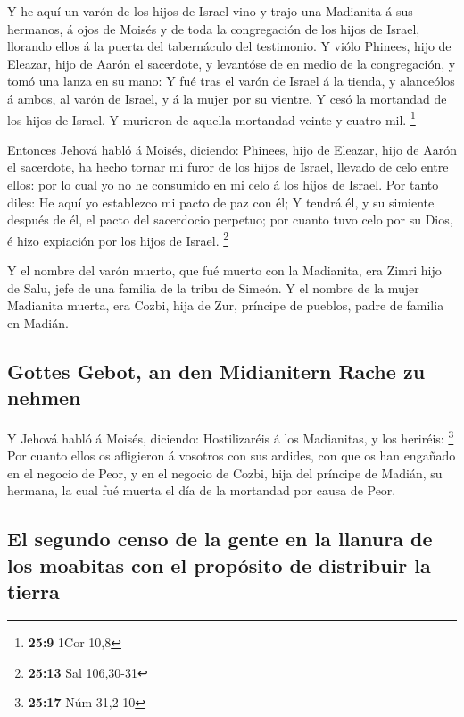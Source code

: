  Y he aquí un varón de los hijos de Israel vino y trajo
una Madianita á sus hermanos, á ojos de Moisés y de toda la congregación
de los hijos de Israel, llorando ellos á la puerta del tabernáculo del
testimonio.  Y viólo Phinees, hijo de Eleazar, hijo de
Aarón el sacerdote, y levantóse de en medio de la congregación, y tomó
una lanza en su mano:  Y fué tras el varón de Israel á la
tienda, y alanceólos á ambos, al varón de Israel, y á la mujer por su
vientre. Y cesó la mortandad de los hijos de Israel.  Y
murieron de aquella mortandad veinte y cuatro mil. \footnote{\textbf{25:9}
  1Cor 10,8}

 Entonces Jehová habló á Moisés, diciendo:
 Phinees, hijo de Eleazar, hijo de Aarón el sacerdote, ha
hecho tornar mi furor de los hijos de Israel, llevado de celo entre
ellos: por lo cual yo no he consumido en mi celo á los hijos de Israel.
 Por tanto diles: He aquí yo establezco mi pacto de paz
con él;  Y tendrá él, y su simiente después de él, el
pacto del sacerdocio perpetuo; por cuanto tuvo celo por su Dios, é hizo
expiación por los hijos de Israel. \footnote{\textbf{25:13} Sal
  106,30-31}

 Y el nombre del varón muerto, que fué muerto con la
Madianita, era Zimri hijo de Salu, jefe de una familia de la tribu de
Simeón.  Y el nombre de la mujer Madianita muerta, era
Cozbi, hija de Zur, príncipe de pueblos, padre de familia en Madián.

\hypertarget{gottes-gebot-an-den-midianitern-rache-zu-nehmen}{%
\subsection{Gottes Gebot, an den Midianitern Rache zu
nehmen}\label{gottes-gebot-an-den-midianitern-rache-zu-nehmen}}

 Y Jehová habló á Moisés, diciendo: 
Hostilizaréis á los Madianitas, y los heriréis: \footnote{\textbf{25:17}
  Núm 31,2-10}  Por cuanto ellos os afligieron á vosotros
con sus ardides, con que os han engañado en el negocio de Peor, y en el
negocio de Cozbi, hija del príncipe de Madián, su hermana, la cual fué
muerta el día de la mortandad por causa de Peor.

\hypertarget{el-segundo-censo-de-la-gente-en-la-llanura-de-los-moabitas-con-el-propuxf3sito-de-distribuir-la-tierra}{%
\subsection{El segundo censo de la gente en la llanura de los moabitas
con el propósito de distribuir la
tierra}\label{el-segundo-censo-de-la-gente-en-la-llanura-de-los-moabitas-con-el-propuxf3sito-de-distribuir-la-tierra}}

